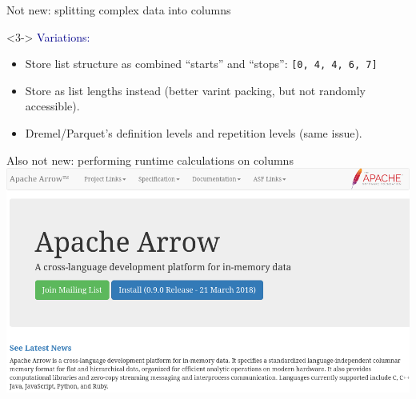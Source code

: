 \documentclass[aspectratio=169]{beamer}
\begin{document}
\begin{frame}{Not new: splitting complex data into columns}
\vspace{0.1 cm}
\begin{uncoverenv}<3->
\textcolor{darkblue}{\large Variations:}
\begin{itemize}
\item Store list structure as combined ``starts'' and ``stops'': {\tt\small [0, 4, 4, 6, 7]}
\item Store as list lengths instead (better varint packing, but not randomly accessible).
\item Dremel/Parquet's definition levels and repetition levels (same issue).
\end{itemize}
\end{uncoverenv}
\end{frame}

\begin{frame}{Also not new: performing runtime calculations on columns}
\vspace{0.3 cm}
\includegraphics[width=\linewidth]{apache-arrow.png}
\end{frame}
\end{document}
